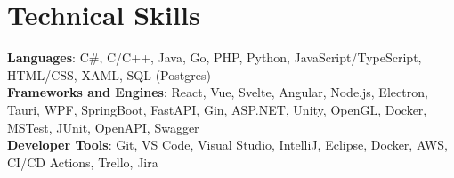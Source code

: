 \documentclass[letterpaper,11pt]{article}
\begin{document}
%
\section{Technical Skills}
 \begin{itemize}[leftmargin=0.15in, label={}]
    \small{\item{
     \textbf{Languages}{: C\#, C/C++, Java, Go, PHP, Python, JavaScript/TypeScript, HTML/CSS, XAML, SQL (Postgres)} \\
     \textbf{Frameworks and Engines}{: React, Vue, Svelte, Angular, Node.js, Electron, Tauri, WPF, SpringBoot, FastAPI, Gin, ASP.NET, Unity, OpenGL, Docker, MSTest, JUnit, OpenAPI, Swagger} \\
     \textbf{Developer Tools}{: Git, VS Code, Visual Studio, IntelliJ, Eclipse, Docker, AWS, CI/CD Actions, Trello, Jira}
    }}
 \end{itemize}
\end{document}
